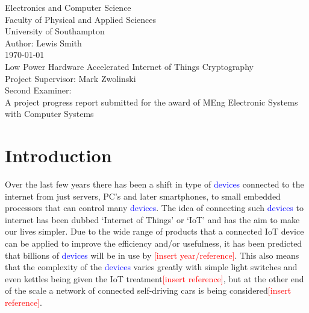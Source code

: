 \documentclass[12pt,twoside,a4paper]{report}
\begin{document}
    
    \begin{titlepage}
    \begin{center}
        \Huge
        Electronics and Computer Science
        \\Faculty of Physical and Applied Sciences
        \\University of Southampton
        \Large
        \\[4cm]Author: Lewis Smith
        \\[1cm]\today
        \Huge
        \\[2cm]Low Power Hardware Accelerated Internet of Things Cryptography
        \large
        \\[4cm]Project Supervisor: Mark Zwolinski
        \\Second Examiner:
        \\[4cm]A project progress report submitted for the award of MEng Electronic Systems with Computer Systems
        
    \end{center}
    \end{titlepage}
    \thispagestyle{empty}
    \cleardoublepage
    
    \begin{abstract}
    
    \lipsum[1-2]
    
    \end{abstract}
    
    \tableofcontents
    
    \chapter{Introduction}
    \label{chapter:intro}
    Over the last few years there has been a shift in type of \textcolor{blue}{devices} connected to the internet from just servers, PC's and later smartphones, to small embedded processors that can control many \textcolor{blue}{devices}.
    The idea of connecting such \textcolor{blue}{devices} to internet has been dubbed `Internet of Things' or `IoT' and has the aim to make our lives simpler.
    Due to the wide range of products that a connected IoT device can be applied to improve the efficiency and/or usefulness, it has been predicted that billions of \textcolor{blue}{devices} will be in use by \textcolor{red}{[insert year/reference]}.
    This also means that the complexity of the \textcolor{blue}{devices} varies greatly with simple light switches and even kettles being given the IoT treatment\textcolor{red}{[insert reference]}, but at the other end of the scale a network of connected self-driving cars is being considered\textcolor{red}{[insert reference]}.
    
\end{document}
